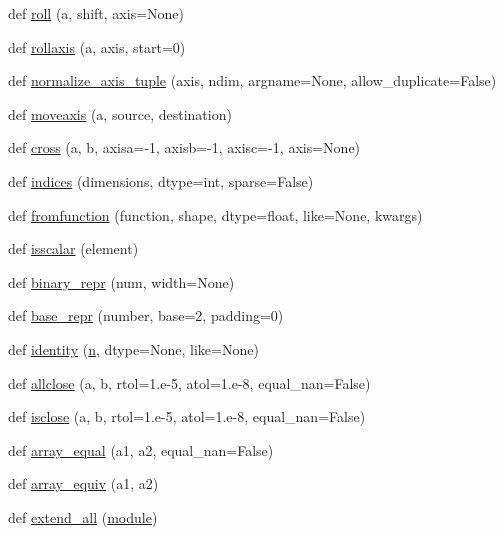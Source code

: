\begin{DoxyCompactItemize}
\item 
def \hyperlink{namespacenumpy_1_1core_1_1numeric_a5503974a131efadeeec73bf5eba4b43f}{roll} (a, shift, axis=None)
\item 
def \hyperlink{namespacenumpy_1_1core_1_1numeric_a644e0d45bac850ac24fee58dc9f0d5cb}{rollaxis} (a, axis, start=0)
\item 
def \hyperlink{namespacenumpy_1_1core_1_1numeric_a9d5bcc0eaa759ce1ab86f25402ae03ac}{normalize\+\_\+axis\+\_\+tuple} (axis, ndim, argname=None, allow\+\_\+duplicate=False)
\item 
def \hyperlink{namespacenumpy_1_1core_1_1numeric_ac7ac41a75a5af16516241f4a6fb96e6b}{moveaxis} (a, source, destination)
\item 
def \hyperlink{namespacenumpy_1_1core_1_1numeric_a2002e78dc75a2cc31a1b29af6feee132}{cross} (a, b, axisa=-\/1, axisb=-\/1, axisc=-\/1, axis=None)
\item 
def \hyperlink{namespacenumpy_1_1core_1_1numeric_ae2f1041249cac51abe61aa5f3ccfc951}{indices} (dimensions, dtype=int, sparse=False)
\item 
def \hyperlink{namespacenumpy_1_1core_1_1numeric_aabe97d2dd9a9996cb96ca02a03ef0ae6}{fromfunction} (function, shape, dtype=float, like=None, kwargs)
\item 
def \hyperlink{namespacenumpy_1_1core_1_1numeric_a505e4f3fa802a70c6090e5e23124f847}{isscalar} (element)
\item 
def \hyperlink{namespacenumpy_1_1core_1_1numeric_a496f8030a53d8ffbaee3639b18116428}{binary\+\_\+repr} (num, width=None)
\item 
def \hyperlink{namespacenumpy_1_1core_1_1numeric_a30faf8e5c0748ef6178c0c588756d7a9}{base\+\_\+repr} (number, base=2, padding=0)
\item 
def \hyperlink{namespacenumpy_1_1core_1_1numeric_a30ce08a6d993ca8e40d80e55ae83cd19}{identity} (\hyperlink{namespacenumpy_a352663c52853d2754274407d5cae2832}{n}, dtype=None, like=None)
\item 
def \hyperlink{namespacenumpy_1_1core_1_1numeric_ad595579ad95d35c8e9b43080cbbe2d19}{allclose} (a, b, rtol=1.e-\/5, atol=1.e-\/8, equal\+\_\+nan=False)
\item 
def \hyperlink{namespacenumpy_1_1core_1_1numeric_a6874bed1b6f01fc26401509337d83ea4}{isclose} (a, b, rtol=1.e-\/5, atol=1.e-\/8, equal\+\_\+nan=False)
\item 
def \hyperlink{namespacenumpy_1_1core_1_1numeric_a2db68b636ed03415538dd11c25adbc6a}{array\+\_\+equal} (a1, a2, equal\+\_\+nan=False)
\item 
def \hyperlink{namespacenumpy_1_1core_1_1numeric_a79b2410c270f1e92358efff765a130fb}{array\+\_\+equiv} (a1, a2)
\item 
def \hyperlink{namespacenumpy_1_1core_1_1numeric_a3287732f6c508bbfb36d38dd66c81a78}{extend\+\_\+all} (\hyperlink{namespacenumpy_1_1core_1_1numeric_ac75d59d42115842ec94bddfcea9eb55e}{module})
\end{DoxyCompactItemize}
